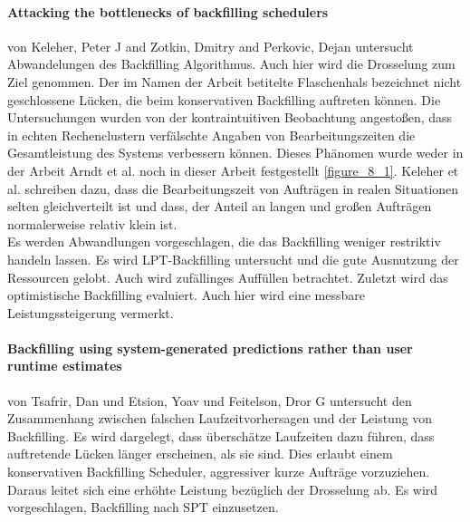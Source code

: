 \paragraph{Attacking the bottlenecks of backfilling schedulers}
von Keleher, Peter J and Zotkin, Dmitry and Perkovic, Dejan \cite{keleher2000attacking} untersucht Abwandelungen des Backfilling Algorithmus. Auch hier wird die Drosselung zum Ziel genommen. Der im Namen der Arbeit betitelte Flaschenhals bezeichnet nicht geschlossene Lücken, die beim konservativen Backfilling auftreten können. Die Untersuchungen wurden von der kontraintuitiven Beobachtung angestoßen, dass in echten Rechenclustern verfälschte Angaben von Bearbeitungszeiten die Gesamtleistung des Systems verbessern können. Dieses Phänomen wurde weder in der Arbeit Arndt et al. \cite{Arn99} noch in dieser Arbeit festgestellt \ref{figure_8_1}. Keleher et al. schreiben dazu, dass die Bearbeitungszeit von Aufträgen in realen Situationen selten gleichverteilt ist und dass, der Anteil an langen und großen Aufträgen normalerweise relativ klein ist.\\
Es werden Abwandlungen vorgeschlagen, die das Backfilling weniger restriktiv handeln lassen. Es wird LPT-Backfilling untersucht und die gute Ausnutzung der Ressourcen gelobt. Auch wird zufällinges Auffüllen betrachtet. Zuletzt wird das optimistische Backfilling evaluiert. Auch hier wird eine messbare Leistungssteigerung vermerkt.

\paragraph{Backfilling using system-generated predictions rather than user runtime estimates} von Tsafrir, Dan und Etsion, Yoav und Feitelson, Dror G untersucht den Zusammenhang zwischen falschen Laufzeitvorhersagen und der Leistung von Backfilling.
Es wird dargelegt, dass überschätze Laufzeiten dazu führen, dass auftretende Lücken länger erscheinen, als sie sind. Dies erlaubt einem konservativen Backfilling Scheduler, aggressiver kurze Aufträge vorzuziehen. Daraus leitet sich eine erhöhte Leistung bezüglich der Drosselung ab. Es wird vorgeschlagen, Backfilling nach SPT einzusetzen. 

\cite{tsafrir2007backfilling}